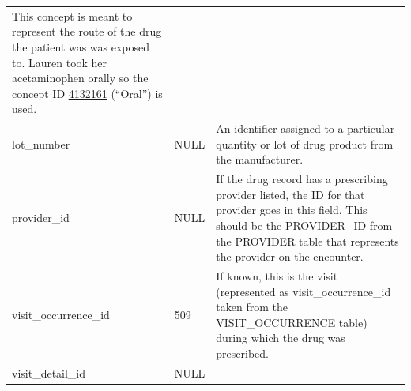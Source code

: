 \documentclass[11pt]{book}
\theoremstyle{definition}
\theoremstyle{definition}
\theoremstyle{definition}
\theoremstyle{remark}
\begin{document}
\begin{longtable}[]{@{}lll@{}}
\begin{minipage}[t]{0.49\columnwidth}
This concept is meant to represent the route of the drug the patient was was exposed to. Lauren took her acetaminophen orally so the concept ID \href{http://athena.ohdsi.org/search-terms/terms/4132161}{4132161} (``Oral'') is used.\strut
\end{minipage}\tabularnewline
\begin{minipage}[t]{0.28\columnwidth}\raggedright
lot\_number\strut
\end{minipage} & \begin{minipage}[t]{0.15\columnwidth}\raggedright
NULL\strut
\end{minipage} & \begin{minipage}[t]{0.49\columnwidth}\raggedright
An identifier assigned to a particular quantity or lot of drug product from the manufacturer.\strut
\end{minipage}\tabularnewline
\begin{minipage}[t]{0.28\columnwidth}\raggedright
provider\_id\strut
\end{minipage} & \begin{minipage}[t]{0.15\columnwidth}\raggedright
NULL\strut
\end{minipage} & \begin{minipage}[t]{0.49\columnwidth}\raggedright
If the drug record has a prescribing provider listed, the ID for that provider goes in this field. This should be the PROVIDER\_ID from the PROVIDER table that represents the provider on the encounter.\strut
\end{minipage}\tabularnewline
\begin{minipage}[t]{0.28\columnwidth}\raggedright
visit\_occurrence\_id\strut
\end{minipage} & \begin{minipage}[t]{0.15\columnwidth}\raggedright
509\strut
\end{minipage} & \begin{minipage}[t]{0.49\columnwidth}\raggedright
If known, this is the visit (represented as visit\_occurrence\_id taken from the VISIT\_OCCURRENCE table) during which the drug was prescribed.\strut
\end{minipage}\tabularnewline
\begin{minipage}[t]{0.28\columnwidth}\raggedright
visit\_detail\_id\strut
\end{minipage} & \begin{minipage}[t]{0.15\columnwidth}\raggedright
NULL\strut
\end{minipage} & \begin{minipage}[t]{0.49\columnwidth}\raggedright

\end{minipage}
\end{longtable}
\end{document}
